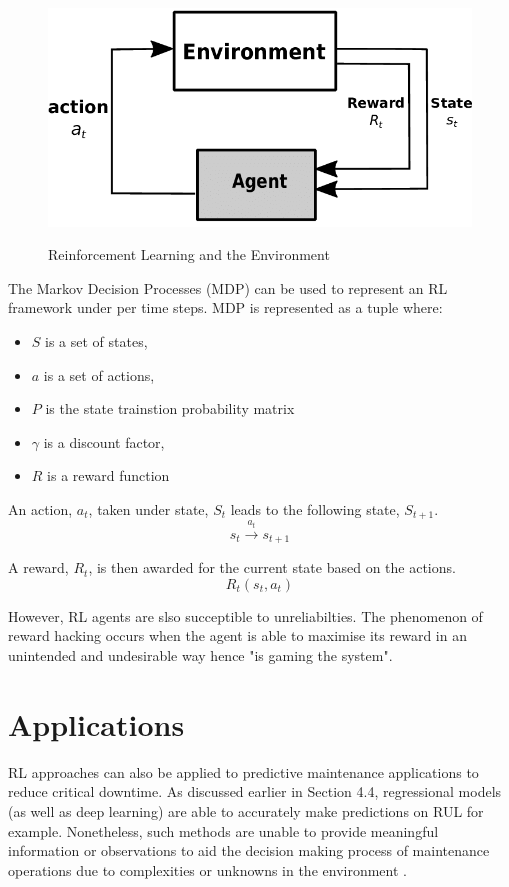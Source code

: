 \documentclass[a4paper,12pt]{report}
\begin{document}
\begin{figure}[H]
    \centering
    \caption{Reinforcement Learning and the Environment \cite{amiri_mehrpouyan_fridman_mallik_nallanathan_matolak_2018}}
    \includegraphics[scale=0.5]{RL.png}
    \label{fig:RL}
\end{figure}

The Markov Decision Processes (MDP) can be used to represent an RL framework under per time steps.
MDP is represented as a tuple where:
\begin{itemize}
    \item $S$ is a set of states,
    \item $a$ is a set of actions,
    \item $P$ is the state trainstion probability matrix
    \item $\gamma$ is a discount factor, 
    \item $R$ is a reward function 
\end{itemize}   

An action, $a_t$, taken under state, $S_t$ leads to the following state, $S_{t+1}$. 
\begin{equation}
    s_t \xrightarrow{a_t} s_{t+1}
\end{equation}

A reward, $R_t$, is then awarded for the current state based on the actions.
\begin{equation}
    R_t(s_t, a_t) 
\end{equation}

However, RL agents are slso succeptible to unreliabilties. The phenomenon of reward hacking occurs when the agent is able to maximise its reward in an unintended and undesirable way hence "is gaming the system".

\section{Applications}
RL approaches can also be applied to predictive maintenance applications to reduce critical downtime. 
As discussed earlier in Section 4.4, regressional models (as well as deep learning) are able to accurately make predictions on RUL for example. 
Nonetheless, such methods are unable to provide meaningful information or observations to aid the decision making process of maintenance operations due to complexities or unknowns in the environment \cite{9221098}.
\end{document}
